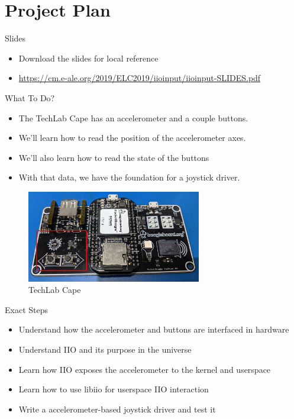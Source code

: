 \section{Project Plan}

\begin{frame}
	{Slides}

	\begin{itemize}
		\item
			Download the slides for local reference
		\item
			\url{https://cm.e-ale.org/2019/ELC2019/iioinput/iioinput-SLIDES.pdf}
	\end{itemize}
\end{frame}

\begin{frame}
	{What To Do?}

	\begin{itemize}
		\item
			The TechLab Cape has an accelerometer and a couple buttons.
		\item
			We'll learn how to read the position of the accelerometer axes.
		\item
			We'll also learn how to read the state of the buttons
		\item
			With that data, we have the foundation for a joystick driver.
	\end{itemize}

	     \begin{figure}[H]
		     \includegraphics[width=3in]{IMAGES/techlab-annotated}
				       \caption{TechLab Cape}
	     \end{figure}
\end{frame}


\begin{frame}
	{Exact Steps}
	\begin{itemize}
		\item
			Understand how the accelerometer and buttons are interfaced in hardware
		\item
			Understand IIO and its purpose in the universe
		\item
			Learn how IIO exposes the accelerometer to the kernel and userspace
		\item
			Learn how to use libiio for userspace IIO interaction
		\item
			Write a accelerometer-based joystick driver and test it
	\end{itemize}
\end{frame}
